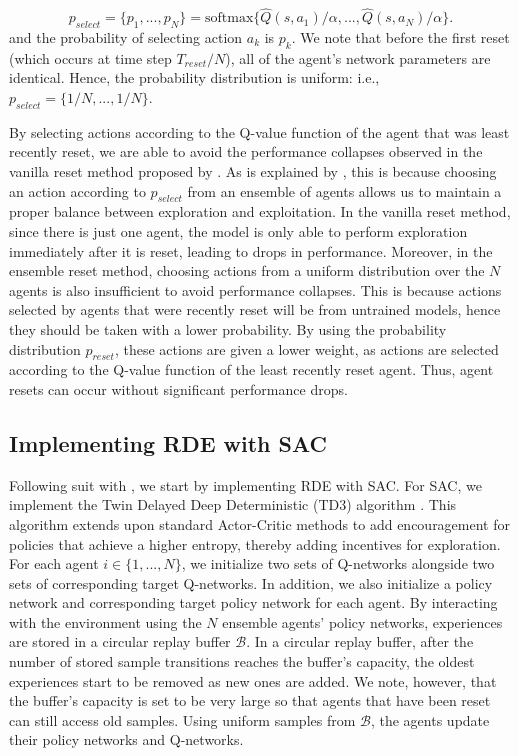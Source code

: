 \documentclass[base]{subfiles}
\begin{document}
\begin{equation}
\label{eq:p_select}
    p_{select} = \{ p_1, ..., p_N \} = \text{softmax} \{ \hat{Q} (s, a_1) / \alpha, ..., \hat{Q} (s, a_N) / \alpha \}.
\end{equation}
and the probability of selecting action $a_k$ is $p_k$. We note that before the first reset (which occurs at time step $T_{reset} / N$), all of the agent's network parameters are identical. Hence, the probability distribution is uniform: i.e., $p_{select} = \{ 1/N, ..., 1/N \}$.

By selecting actions according to the Q-value function of the agent that was least recently reset, we are able to avoid the performance collapses observed in the vanilla reset method proposed by \cite{nikishin2022}.
As is explained by \cite{kim2023}, this is because choosing an action according to $p_{select}$ from an ensemble of agents allows us to maintain a proper balance between exploration and exploitation. 
In the vanilla reset method, since there is just one agent, the model is only able to perform exploration immediately after it is reset, leading to drops in performance.
Moreover, in the ensemble reset method, choosing actions from a uniform distribution over the $N$ agents is also insufficient to avoid performance collapses.
This is because actions selected by agents that were recently reset will be from untrained models, hence they should be taken with a lower probability.
By using the probability distribution $p_{reset}$, these actions are given a lower weight, as actions are selected according to the Q-value function of the least recently reset agent. 
Thus, agent resets can occur without significant performance drops.

\subsection{Implementing RDE with SAC}

Following suit with \cite{kim2023}, we start by implementing RDE with SAC. 
For SAC, we implement the Twin Delayed Deep Deterministic (TD3) algorithm \cite{sac, fujimoto2018}. 
This algorithm extends upon standard Actor-Critic methods to add encouragement for policies that achieve a higher entropy, thereby adding incentives for exploration. 
For each agent $i \in \{1,...,N\}$, we initialize two sets of Q-networks alongside two sets of corresponding target Q-networks. 
In addition, we also initialize a policy network and corresponding target policy network for each agent. 
By interacting with the environment using the $N$ ensemble agents' policy networks, experiences are stored in a circular replay buffer $\mathcal{B}$.
In a circular replay buffer, after the number of stored sample transitions reaches the buffer's capacity, the oldest experiences start to be removed as new ones are added.
We note, however, that the buffer's capacity is set to be very large so that agents that have been reset can still access old samples.
Using uniform samples from $\mathcal{B}$, the agents update their policy networks and Q-networks. 
\end{document}
